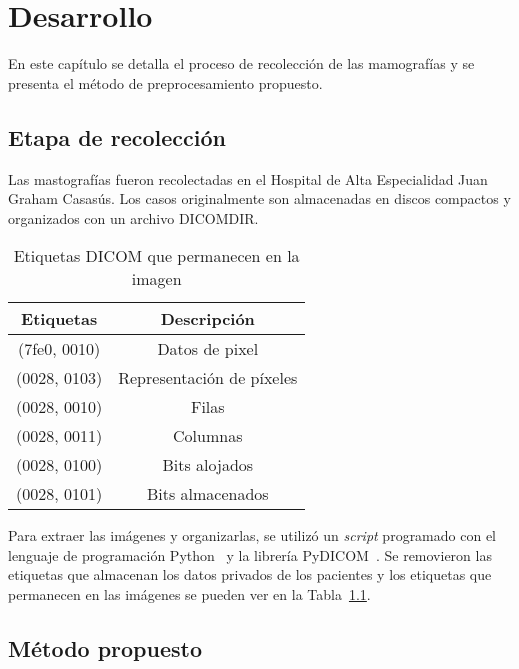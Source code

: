 \chapter{Desarrollo}
\label{desarrollo}

En este capítulo se detalla el proceso de recolección de las mamografías y se
presenta el método de preprocesamiento propuesto.

\section{Etapa de recolección}

Las mastografías fueron recolectadas en el Hospital de Alta Especialidad Juan
Graham Casasús. Los casos originalmente son almacenadas en discos compactos y
organizados con un archivo DICOMDIR.

\begin{table}[h]
  \caption[Etiquetas DICOM]{Etiquetas DICOM que permanecen en la imagen}
  \label{table:dicomtags}
\begin{center}
{\scriptsize
    \begin{tabular}{c|c}
    \hline
    {\bf Etiquetas} &
    {\bf Descripción} \\
    \hline
        (7fe0, 0010) & Datos de pixel\\
        (0028, 0103) & Representación de píxeles \\
        (0028, 0010) & Filas \\
        (0028, 0011) & Columnas \\
        (0028, 0100) & Bits alojados \\
        (0028, 0101) & Bits almacenados \\
    \hline
    \end{tabular}
}
\end{center}
\end{table}

Para extraer las imágenes y organizarlas, se utilizó un \textit{script}
programado con el lenguaje de programación Python~\cite{python} y la librería
PyDICOM~\cite{pydicom}. Se removieron las etiquetas que almacenan los datos
privados de los pacientes y los etiquetas que permanecen en las imágenes se
pueden ver en la Tabla~\ref{table:dicomtags}.

\section{Método propuesto}

